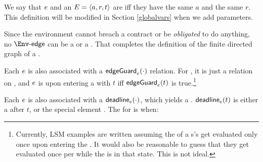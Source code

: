 \documentclass[12pt]{article}
\begin{document}
We say that \atransition $e$ and an \Event $E = \langle a,r,t\rangle$ are  iff they have the same \Action $a$ and the same \Role $r$. This definition will be modified in Section \ref{globalvars} when we add \Event parameters.
\medskip





Since the environment \Env cannot breach a contract or be {\it obligated} to do anything, no $\depTrans{\Env}$ can be a \mustntran or a \rmustntran.
That completes the definition of the finite directed graph \skeleton of a \Contract.

\medskip

Each \transition $e$ is also associated with a  $\textsf{edgeGuard}_{e}(\cdot)$ relation. For \FSContracts, it is just a relation on \TimeStamps,
and \atransition $e$ is  upon entering a \GlobalState with \TimeStamp $t$ iff $\textsf{edgeGuard}_{e}(t)$ is true.\footnote{Currently, LSM examples are written assuming the \TGuards of a \State s's \transitions get evaluated only once upon entering the \State. It would also be reasonable to guess that they get evaluated once per \TimeUnit while the \Contract is in that state. This is not ideal.}  

\medskip

Each \transition $e$ is also associated with a  $\textsf{deadline}_{e}(\cdot)$, which yields a . $\textsf{deadline}_{e}(t)$ is either a \TimeStamp after $t$, or the special element . The \Deadline for \atransition is when:
\end{document}
